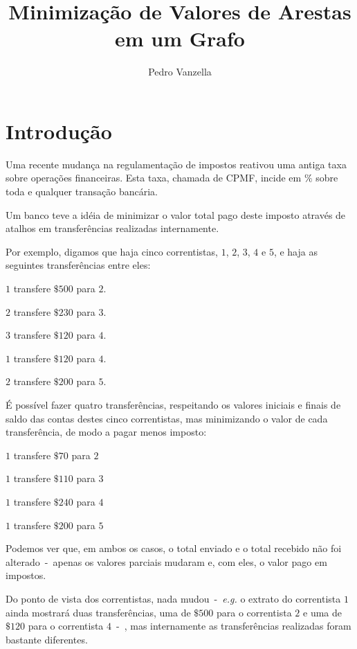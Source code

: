 \documentclass[12pt]{article}
\title{Minimização de Valores de Arestas em um Grafo}
\author{Pedro Vanzella}
\begin{document}
\maketitle

\section{Introdução}\label{sec:intro}

Uma recente mudança na regulamentação de impostos reativou uma antiga taxa sobre
operações financeiras. Esta taxa, chamada de CPMF, incide em $\%$ sobre toda e qualquer
transação bancária.

Um banco teve a idéia de minimizar o valor total pago deste imposto através de
atalhos em transferências realizadas internamente.

Por exemplo, digamos que haja cinco correntistas, $1$, $2$, $3$, $4$
 e $5$, e haja as seguintes transferências entre eles:
\begin{list}{}{}
  \item $1$ transfere $\$500$ para $2$.
  \item $2$ transfere $\$230$ para $3$.
  \item $3$ transfere $\$120$ para $4$.
  \item $1$ transfere $\$120$ para $4$.
  \item $2$ transfere $\$200$ para $5$.
\end{list}


É possível fazer quatro transferências, respeitando os valores iniciais e finais
de saldo das contas destes cinco correntistas, mas minimizando o valor de cada
transferência, de modo a pagar menos imposto:

\begin{list}{}{}
  \item $1$ transfere $\$70$ para $2$
  \item $1$ transfere $\$110$ para $3$
  \item $1$ transfere $\$240$ para $4$
  \item $1$ transfere $\$200$ para $5$
\end{list}

Podemos ver que, em ambos os casos, o total enviado e o total recebido não foi
alterado~-~apenas os valores parciais mudaram e, com eles, o valor pago em impostos.

Do ponto de vista dos correntistas, nada mudou~-~\textit{e.g.} o extrato do
correntista $1$ ainda mostrará duas transferências, uma de $\$500$ para o
correntista $2$ e uma de $\$120$ para o correntista $4$~-~, mas internamente as
transferências realizadas foram bastante diferentes.
\end{document}

